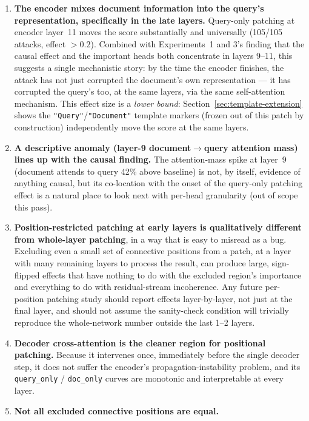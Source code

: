 \documentclass[11pt]{article}
\begin{document}
\begin{enumerate}
  \item \textbf{The encoder mixes document information into the query's
  representation, specifically in the late layers.} Query-only patching
  at encoder layer~11 moves the score substantially and universally
  (105/105 attacks, effect $>0.2$). Combined with Experiments~1 and 3's
  finding that the causal effect and the important heads both concentrate
  in layers 9--11, this suggests a single mechanistic story: by the time
  the encoder finishes, the attack has not just corrupted the document's
  own representation — it has corrupted the query's too, at the same
  layers, via the same self-attention mechanism. This effect size is a
  \emph{lower bound}: Section~\ref{sec:template-extension} shows the
  \texttt{"Query"}/\texttt{"Document"} template markers (frozen out of this
  patch by construction) independently move the score at the same layers.
  \item \textbf{A descriptive anomaly (layer-9 document$\to$query
  attention mass) lines up with the causal finding.} The attention-mass
  spike at layer~9 (document attends to query 42\% above baseline) is not,
  by itself, evidence of anything causal, but its co-location with the
  onset of the query-only patching effect is a natural place to look next
  with per-head granularity (out of scope this pass).
  \item \textbf{Position-restricted patching at early layers is
  qualitatively different from whole-layer patching}, in a way that is
  easy to misread as a bug. Excluding even a small set of connective
  positions from a patch, at a layer with many remaining layers to
  process the result, can produce large, sign-flipped effects that have
  nothing to do with the excluded region's importance and everything to
  do with residual-stream incoherence. Any future per-position patching
  study should report effects layer-by-layer, not just at the final layer,
  and should not assume the sanity-check condition will trivially reproduce
  the whole-network number outside the last 1--2 layers.
  \item \textbf{Decoder cross-attention is the cleaner region for
  positional patching.} Because it intervenes once, immediately before
  the single decoder step, it does not suffer the encoder's
  propagation-instability problem, and its \texttt{query\_only} /
  \texttt{doc\_only} curves are monotonic and interpretable at every layer.
  \item \textbf{Not all excluded connective positions are equal.}

\end{enumerate}
\end{document}
